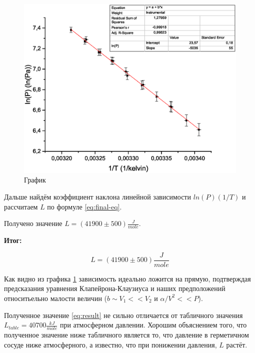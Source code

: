 \documentclass[a4paper,12pt]{article}
\begin{document}
\begin{figure}[ht]
\centering
\includegraphics[width=170mm]{graph1.eps}
\caption{График}\label{graph_1}
\end{figure}

Дальше найдём коэффициент наклона линейной зависимости $ ln(P)(1/T) $ и рассчитаем $L$ по формуле \ref{eq:final-eq}.

\bigskip\bigskip\bigskip\bigskip\bigskip\bigskip\bigskip\bigskip\bigskip\bigskip\bigskip\bigskip

Получено значение $L = (41900 \pm 500) \frac{J}{mole}$.
\bigskip

\textbf{Итог:}
\bigskip

\begin{equation}\label{eq:result}
L = (41900 \pm 500) \frac{J}{mole}
\end{equation}

Как видно из графика \ref{graph_1} зависимость идеально ложится на прямую, подтверждая предсказания уравнения Клапейрона-Клаузиуса и наших предположений относитьельно малости величин ($b \sim V_1 << V_2$ и $\alpha/V^2 << P$). 

Полученное значение \ref{eq:result} не сильно отличается от табличного значения $L_{table} = 40700 \frac{kJ}{mole}$ при атмосферном давлении. Хорошим объяснением того, что полученное значение ниже табличного является то, что давление в герметичном сосуде ниже атмосферного, а известно, что при понижении давления, $L$ растёт.
 
\end{document}
